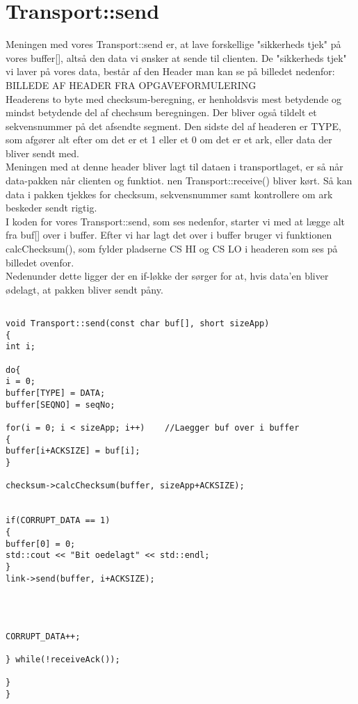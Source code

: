 \graphicspath{{Chapters/Mikrofonmontering/}}

\chapter{Transport::send}

Meningen med vores Transport::send er, at lave forskellige "sikkerheds tjek" på vores buffer[], altså den data vi ønsker at sende til clienten. De "sikkerheds tjek" vi laver på vores data, består af den Header man kan se på billedet nedenfor:\\
BILLEDE AF HEADER FRA OPGAVEFORMULERING\\
Headerens to byte med checksum-beregning, er henholdsvis mest betydende og mindst betydende del af chechsum beregningen. Der bliver også tildelt et sekvensnummer på det afsendte segment. Den sidste del af headeren er TYPE, som afgører alt efter om det er et 1 eller et 0 om det er et ark, eller data der bliver sendt med.\\
Meningen med at denne header bliver lagt til dataen i transportlaget, er så når data-pakken når clienten og funktiot. 
nen Transport::receive() bliver kørt. Så kan data i pakken tjekkes for checksum, sekvensnummer samt kontrollere om ark beskeder sendt rigtig.\\
I koden for vores Transport::send, som ses nedenfor, starter vi med at lægge alt fra buf[] over i buffer. Efter vi har lagt det over i buffer bruger vi funktionen calcChecksum(), som fylder pladserne CS HI og CS LO i headeren som ses på billedet ovenfor. \\
Nedenunder dette ligger der en if-løkke der sørger for at, hvis data'en bliver ødelagt, at pakken bliver sendt påny.


\begin{lstlisting}[frame=single]  % Start your code-block

void Transport::send(const char buf[], short sizeApp)
{
int i;

do{
i = 0;
buffer[TYPE] = DATA;
buffer[SEQNO] = seqNo;

for(i = 0; i < sizeApp; i++)    //Laegger buf over i buffer
{
buffer[i+ACKSIZE] = buf[i];
}

checksum->calcChecksum(buffer, sizeApp+ACKSIZE);


if(CORRUPT_DATA == 1)
{
buffer[0] = 0;
std::cout << "Bit oedelagt" << std::endl;
}
link->send(buffer, i+ACKSIZE);




CORRUPT_DATA++;

} while(!receiveAck());

}
}
\end{lstlisting}
